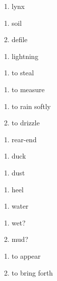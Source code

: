 \begin{enumerate}
\item lynx
\end{enumerate}
\begin{enumerate}
\item soil
\item defile
\end{enumerate}
\begin{enumerate}
\item lightning
\end{enumerate}
\begin{enumerate}
\item to steal
\end{enumerate}
\begin{enumerate}
\item to measure
\end{enumerate}
\begin{enumerate}
\item to rain softly
\item to drizzle
\end{enumerate}
\begin{enumerate}
\item rear-end
\end{enumerate}
\begin{enumerate}
\item duck
\end{enumerate}
\begin{enumerate}
\item dust
\end{enumerate}
\begin{enumerate}
\item heel
\end{enumerate}
\begin{enumerate}
\item water
\end{enumerate}
\begin{enumerate}
\item wet?
\item mud?
\end{enumerate}
\begin{enumerate}
\item to appear
\item to bring forth
\end{enumerate}
